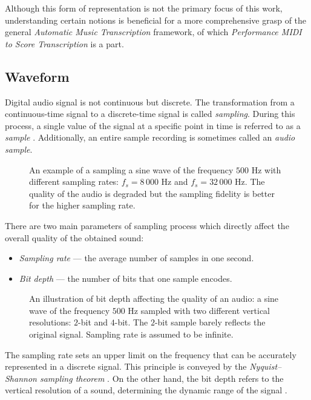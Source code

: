 Although this form of representation is not the primary focus of this work, understanding certain notions is beneficial for a more comprehensive grasp of the general \emph{Automatic Music Transcription} framework, of which \emph{Performance MIDI to Score Transcription} is a part.

\subsection{Waveform}

Digital audio signal is not continuous but discrete. The transformation from a continuous-time signal to a discrete-time signal is called \emph{sampling}. During this process, a single value of the signal at a specific point in time is referred to as a \emph{sample} \cite[p.~34--35]{Smith1999}. Additionally, an entire sample recording is sometimes called an \emph{audio sample}.

\begin{figure}[ht!]
\centering

\caption[An example of a sampling a sine wave with different sampling rates.]{An example of a sampling a sine wave of the frequency $500$ Hz with different sampling rates: $f_s = 8\,000$ Hz and $f_s = 32\,000$ Hz. The quality of the audio is degraded but the sampling fidelity is better for the higher sampling rate.}
\end{figure}

There are two main parameters of sampling process which directly affect the overall quality of the obtained sound:
\begin{itemize}
   \item \emph{Sampling rate} --- the average number of samples in one second.
   \item \emph{Bit depth} --- the number of bits that one sample encodes.
\end{itemize}

\begin{figure}[ht!]
\centering

\caption[An illustration of bit depth affecting the quality of an audio.]{An illustration of bit depth affecting the quality of an audio: a sine wave of the frequency $500$ Hz sampled with two different vertical resolutions: $2$-bit and $4$-bit. The $2$-bit sample barely reflects the original signal. Sampling rate is assumed to be infinite.}
\end{figure}

The sampling rate sets an upper limit on the frequency that can be accurately represented in a discrete signal. This principle is conveyed by the \emph{Nyquist–Shannon sampling theorem} \cite[p.~40]{Smith1999}. On the other hand, the bit depth refers to the vertical resolution of a sound, determining the dynamic range of the signal \cite[p.~36]{Smith1999}.


